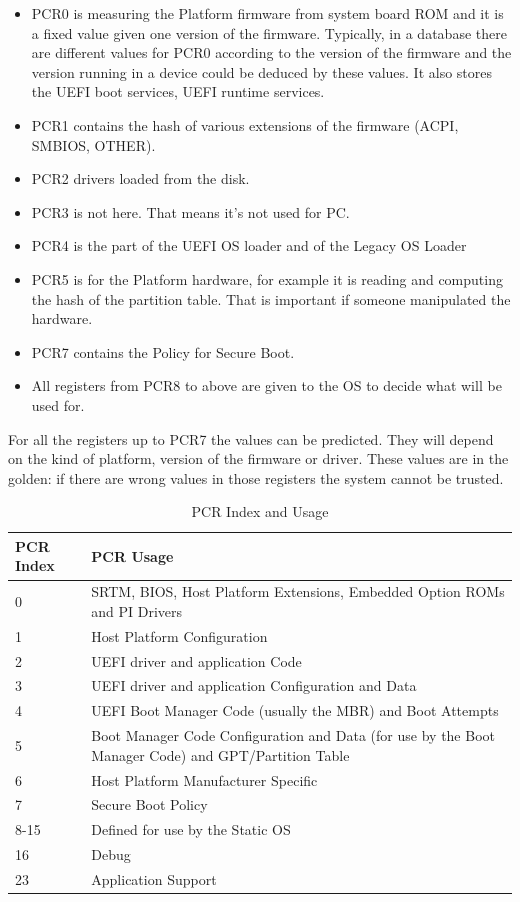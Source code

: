 \begin{itemize}

  \item PCR0 is measuring the Platform firmware from system board ROM
    and it is a fixed value given one version of the firmware.
    Typically, in a database there are different values for PCR0
    according to the version of the firmware and the version running
    in a device could be deduced by these values. It also stores the
    UEFI boot services, UEFI runtime services.
  \item PCR1 contains the hash of various extensions of the firmware
    (ACPI, SMBIOS, OTHER).
  \item PCR2 drivers loaded from the disk.
  \item PCR3 is not here. That means it's not used for PC.
  \item PCR4 is the part of the UEFI OS loader and of the Legacy OS
    Loader
  \item PCR5 is for the Platform hardware, for example it is reading
    and computing the hash of the partition table. That is important
    if someone manipulated the hardware.
  \item PCR7 contains the Policy for Secure Boot.
  \item All registers from PCR8 to above are given to the OS to decide
    what will be used for.
\end{itemize}
For all the registers up to PCR7 the values can be predicted. They
will depend on the kind of platform, version of the firmware or
driver. These values are in the golden: if there are wrong values in
those registers the system cannot be trusted.
\begin{table}[H]
  \centering
  \begin{tabular}{|p{}|p{}|}
    \hline
    \textbf{PCR Index} & \textbf{PCR Usage} \\ \hline
    0 & SRTM, BIOS, Host Platform Extensions, Embedded Option ROMs and
    PI Drivers \\ \hline
    1 & Host Platform Configuration \\ \hline
    2 & UEFI driver and application Code \\ \hline
    3 & UEFI driver and application Configuration and Data \\ \hline
    4 & UEFI Boot Manager Code (usually the MBR) and Boot Attempts \\
    \hline
    5 & Boot Manager Code Configuration and Data (for use by the Boot
    Manager Code) and GPT/Partition Table \\ \hline
    6 & Host Platform Manufacturer Specific \\ \hline
    7 & Secure Boot Policy \\ \hline
    8-15 & Defined for use by the Static OS \\ \hline
    16 & Debug \\ \hline
    23 & Application Support \\ \hline
  \end{tabular}
  \caption{PCR Index and Usage}
  \label{table:pcr_usage}
\end{table}

